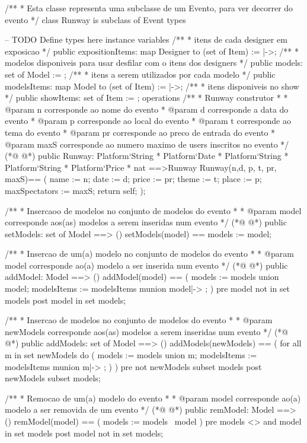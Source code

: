\begin{vdmpp}[breaklines=true]
/**
* Esta classe representa uma subclasse de um Evento, para ver  decorrer do evento 
*/
class Runway is subclass of Event
types

-- TODO Define types here
instance variables
 /**
 * itens de cada designer em exposicao
 */
 public expositionItems: map Designer to (set of Item) := {|->};
 /**
 * modelos disponiveis para usar desfilar com o itens dos designers
 */
  public models: set of Model := {};
  /**
 * itens a serem utilizados por cada modelo
 */
  public modelsItems: map Model to (set of Item) := {|->};
  /**
 * itens disponiveis no show
 */
  public showItems: set of Item := {};
operations
 /**
 * Runway construtor
 * 
 * @param n corresponde ao nome do evento
 * @param d corresponde a  data do evento
 * @param p corresponde ao local do evento
 * @param t corresponde ao tema do evento
 * @param pr corresponde ao preco de entrada do evento
 * @param maxS corresponde ao numero maximo de users inscritos no evento
 */
(*@
\label{Runway:36}
@*)
 public Runway: Platform`String * Platform`Date * Platform`String *  Platform`String * Platform`Price * nat ==>Runway
 Runway(n,d, p, t, pr, maxS)==
 (
  name := n;
  date := d;
  price := pr;
  theme := t;
  place := p;
  maxSpectators := maxS;
  return self;
 );
 
 /**
 * Insercaoo de modelos no conjunto de modelos do evento
 * 
 * @param model corresponde aos(as) modelos a serem inseridas num evento
 */
(*@
\label{setModels:53}
@*)
 public setModels: set of Model ==> ()
   setModels(model) == 
    models := model;
 
 /**
 * Insercao de um(a) modelo no conjunto de modelos do evento
 * 
 * @param model corresponde ao(a) modelo a ser inserida num evento
 */
(*@
\label{addModel:62}
@*)
 public addModel: Model ==> ()
  addModel(model) == (
     models := models union {model};
     modelsItems := modelsItems munion {model|-> {}};
  )
 pre model not in set models
 post model in set models;
 
 /**
 * Insercao de modelos no conjunto de modelos do evento
 * 
 * @param newModels corresponde aos(as) modelos a serem inseridas num evento
 */
(*@
\label{addModels:75}
@*)
 public addModels: set of Model ==> ()
  addModels(newModels) == (
    for all m in set newModels do (
      models := models union {m};
      modelsItems := modelsItems munion {m|-> {}};
   )
   )
 pre not newModels subset models
 post newModels subset models;
  
 /**
 * Remocao de um(a) modelo do evento
 * 
 * @param model corresponde ao(a) modelo a ser removida de um evento
 */
(*@
\label{remModel:90}
@*)
 public remModel: Model ==> ()
  remModel(model) == (
     models := models \ {model}
   )
 pre models <> {} and model in set models
 post model not in set models;
 

\end{vdmpp}
